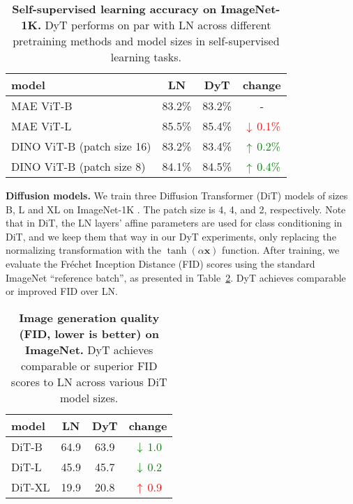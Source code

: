 \documentclass[]{fairmeta}
\def\vx{{\bm{x}}}
\newcommand{\tablestyle}[2]{\setlength{\tabcolsep}{#1}\renewcommand{\arraystretch}{#2}\centering\footnotesize}
\renewcommand{\paragraph}[1]{\vspace{1.25mm}\noindent\textbf{#1}}
\newcommand{\better}[1]{\textcolor{green}{$\uparrow\,$#1}}
\newcommand{\worse}[1]{\textcolor{red}{$\downarrow\,$#1}}
\newcommand{\betterinv}[1]{\textcolor{green}{$\downarrow\,$#1}}
\newcommand{\worseinv}[1]{\textcolor{red}{$\uparrow\,$#1}}
\begin{document}
\begin{table}[h]
\centering
\tablestyle{7pt}{1.15}
\begin{tabular}{lccc}
\toprule
model & LN & DyT & change \\
\midrule
MAE ViT-B & 83.2\% & 83.2\% & - \\
MAE ViT-L & 85.5\% & 85.4\% & \worse{0.1\%} \\
DINO ViT-B (patch size 16) & 83.2\% & 83.4\% & \better{0.2\%} \\
DINO ViT-B (patch size 8) & 84.1\% & 84.5\% & \better{0.4\%} \\
\midrule
\end{tabular}
\caption{\textbf{Self-supervised learning accuracy on ImageNet-1K.} DyT performs on par with LN across different pretraining methods and model sizes in self-supervised learning tasks. }
\label{table:self_supervised_learning}
\end{table}

\paragraph{Diffusion models.} We train three Diffusion Transformer (DiT) models \citep{peebles2023scalable} of sizes B, L and XL on ImageNet-1K \citep{deng2009imagenet}. The patch size is 4, 4, and 2, respectively. Note that in DiT, the LN layers' affine parameters are used for class conditioning in DiT, and we keep them that way in our DyT experiments, only replacing the normalizing transformation with the $\tanh(\alpha \vx)$ function. After training, we evaluate the Fréchet Inception Distance (FID) scores using the standard ImageNet ``reference batch'', as presented in Table~\ref{table:diffusion}.
DyT achieves comparable or improved FID over LN.

\begin{table}[h!]
\centering
\tablestyle{7pt}{1.15}
\begin{tabular}{lccc}
\toprule
model & LN & DyT & change  \\
\midrule
DiT-B & 64.9 & 63.9 & \betterinv{1.0} \\
DiT-L & 45.9 & 45.7 & \betterinv{0.2} \\
DiT-XL & 19.9 & 20.8 & \worseinv{0.9} \\
\midrule
\end{tabular}
\caption{\textbf{Image generation quality (FID, lower is better) on ImageNet.} DyT achieves comparable or superior FID scores to LN across various DiT model sizes.}
\label{table:diffusion}
\end{table}
\end{document}

